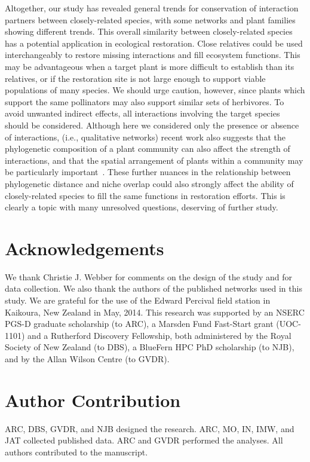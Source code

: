 \documentclass[12pt]{article}
\begin{document}
\begin{spacing}{1.5}
  Altogether, our study has revealed general trends for conservation of interaction
  partners between closely-related species, with some networks and plant 
  families showing different trends. This overall similarity between closely-related
  species has a potential application in ecological restoration. Close relatives could
  be used interchangeably to restore missing interactions and fill ecosystem functions. 
  This may be advantageous when a target plant is more difficult to establish than its
  relatives, or if the restoration site is not large enough to support viable populations 
  of many species. We should urge caution, however, since plants which support the
  same pollinators may also support similar sets of herbivores. To avoid unwanted 
  indirect effects, all interactions involving the target species should be considered.
  Although here we considered only the presence or absence of interactions,
  (i.e., qualitative networks)
  recent work also suggests that the phylogenetic composition of a plant
  community can also affect the strength of 
  interactions, and that the spatial arrangement of plants within a 
  community may be particularly important~\citep{Yguel2011,Castagneyrol2014}.
  These further nuances in the relationship between phylogenetic distance and 
  niche overlap could also strongly affect the ability of closely-related species to
  fill the same functions in restoration efforts. This is clearly a topic with many
  unresolved questions, deserving of further study.

\clearpage

\section*{Acknowledgements}
  
  We thank Christie J. Webber for comments on the design of the 
  study and for data collection. 
  We also thank the authors of the published networks used in this study. 
  We are grateful for the use of the Edward Percival field station in Kaikoura, 
  New Zealand in May, 2014. This research was supported by an NSERC PGS-D 
  graduate scholarship (to ARC), a Marsden Fund Fast-Start grant (UOC-1101) and a 
  Rutherford Discovery Fellowship, both administered by the Royal Society of New 
  Zealand (to DBS), a BlueFern HPC PhD scholarship (to NJB), and by
  the Allan Wilson Centre (to GVDR).


\section*{Author Contribution}

  ARC, DBS, GVDR, and NJB designed the research. ARC, MO, IN, IMW, and JAT collected published data. 
  ARC and GVDR performed the analyses. All authors contributed to the manuscript.

\end{spacing}
\end{document}

